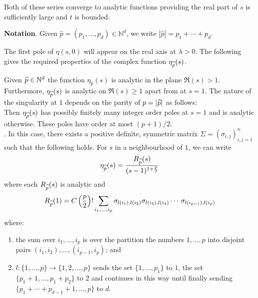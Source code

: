 \documentclass[12pt,a4paper,reqno]{amsart}
\begin{document}
Both of these series converge to analytic functions providing the real part of $s$ is sufficiently large and $t$ is bounded.

\medskip
\noindent
{\bf Notation}.  Given $\widehat{p} =(p_1,\ldots,p_d) \in \mathbb N^d$, we write $|\widehat{p}| = p_1 +\cdots+p_d$.
\medskip


The first pole of $\eta(s,0)$ will appear on the real axis at $\lambda > 0$. The following gives the required properties of the complex function $\eta_{\widehat{p}}(s)$.

\begin{proposition}\label{prop.analyticity}
Given $\widehat{p} \in \mathbb{N}^d$ the function $\eta_{\widehat{p}}(s)$ is analytic in the plane $\mathfrak{R}(s) > 1$. Furthermore, $\eta_{\widehat{p}}(s)$ is analytic on $\mathfrak{R}(s) \ge 1$ apart from at $s = 1$. The nature   of the singularity at  $1$ depends on the  parity of $p = |\widehat{p}|$ as follows:\\
 Then $\eta_{\widehat{p}}(s)$ has possibly finitely many  integer order poles at $s =1$ and is analytic otherwise. These poles have order at most $(p+1)/2$.\\
. In this case, there exists a positive definite, symmetric matrix $ \Sigma = (\sigma_{i,j})_{i,j=1}^n$
such that the following holds. For $s$ in a neighbourhood of $1$, we can write
\[
\eta_{\widehat{p}}(s) = \frac{R_{\widehat{p}}(s)}{(s-1)^{1+ \frac{p}{2}}}
\]
where each $R_{\widehat{p}}(s)$ is analytic and
\[
R_{\widehat{p}}(1) = C\left(\frac{p}{2}\right)! \sum_{i_1, \ldots, i_{p} } \sigma_{l(i_1),l(i_2)} \sigma_{l(i_3),l(i_4)} \cdots \, \sigma_{l(i_{p-1}), l(i_{p})}
\]
where:
\begin{enumerate}
\item
the sum over $i_1, \ldots, i_{p}$ is over the partition the numbers $1,\ldots, p$ into disjoint pairs  $(i_1,i_2), \ldots, (i_{p-1},i_{p})$; and 
\item $l : \{1, \ldots, p \} \to \{1,2,\ldots,p\}$ sends the set $\{1,\ldots,p_1\}$ to $1$,  the set $\{p_1+1, \ldots, p_1+p_2\}$ to $2$ and continues in this way until finally sending $\{p_1+\cdots + p_{d-1} + 1, \ldots, p\}$ to $d$.
\end{enumerate}
\end{proposition}
\end{document}
